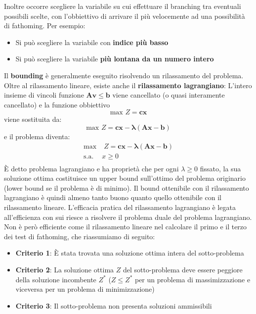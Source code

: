 \documentclass[12pt]{article}
\begin{document}
Inoltre occorre scegliere la variabile su cui effettuare il branching tra eventuali possibili scelte, con l'obbiettivo di arrivare il più velocemente ad una possibilità di fathoming.
Per esempio:
\begin{itemize}
    \item Si può scegliere la variabile con \textbf{indice più basso}
    \item Si può scegliere la variabile \textbf{più lontana da un numero intero}
\end{itemize} 
Il \textbf{bounding} è generalmente eseguito risolvendo un rilassamento del problema.
Oltre al rilassamento lineare, esiste anche il \textbf{rilassamento lagrangiano}: \newline
L'intero insieme di vincoli funzione $\boldsymbol{Av} \leq \boldsymbol{b}$ viene cancellato (o quasi interamente cancellato) e la funzione obbiettivo
$$\textrm{max } Z = \boldsymbol{cx}$$
viene sostituita da:
$$\textrm{max } Z = \boldsymbol{cx} - \boldsymbol{\lambda}(\boldsymbol{Ax} - \boldsymbol{b})$$
e il problema diventa:
\begin{equation*}
    \begin{array}{ll}
        \displaystyle \textrm{max} & \; Z = \boldsymbol{cx} - \boldsymbol{\lambda}(\boldsymbol{Ax}-\boldsymbol{b})\\
        \textrm{s.a.} & x \geq 0\\
    \end{array}
\end{equation*}
È detto problema lagrangiano e ha proprietà che per ogni $\lambda \geq 0$ fissato, la sua soluzione ottima costituisce
un upper bound sull'ottimo del problema originario (lower bound se il problema è di minimo).
Il bound ottenibile con il rilassamento lagrangiano è quindi almeno tanto buono quanto quello ottenibile con il rilassamento lineare.
L'efficacia pratica del rilassamento lagrangiano è legata all'efficienza con sui riesce a risolvere il problema duale del problema lagrangiano.
Non è però efficiente come il rilassamento lineare nel calcolare il primo e il terzo dei test di fathoming, che riassumiamo di seguito:
\begin{itemize}
    \item \textbf{Criterio 1}: È stata trovata una soluzione ottima intera del sotto-problema
    \item \textbf{Criterio 2}: La soluzione ottima $Z$ del sotto-problema deve essere peggiore della soluzione incombente $Z^*$ ($Z \leq Z^*$ per un problema di massimizzazione e viceversa per un problema di minimizzazione)
    \item \textbf{Criterio 3}: Il sotto-problema non presenta soluzioni ammissibili
\end{itemize}
\end{document}
